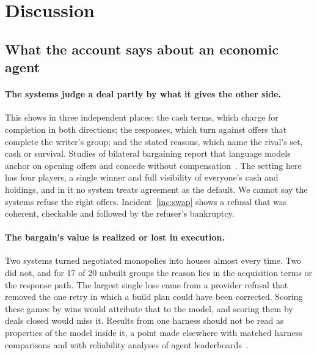 \section{Discussion}
\label{sec:discussion}

\subsection{What the account says about an economic agent}

\paragraph{The systems judge a deal partly by what it gives the other side.} This shows in three independent places: the cash terms, which charge for completion in both directions; the responses, which turn against offers that complete the writer's group; and the stated reasons, which name the rival's set, cash or survival. Studies of bilateral bargaining report that language models anchor on opening offers and concede without compensation~\cite{cosentino2026counterparty,shah2025rationalis}. The setting here has four players, a single winner and full visibility of everyone's cash and holdings, and in it no system treats agreement as the default. We cannot say the systems refuse the right offers. Incident~\ref{inc:swap} shows a refusal that was coherent, checkable and followed by the refuser's bankruptcy.

\paragraph{The bargain's value is realized or lost in execution.} Two systems turned negotiated monopolies into houses almost every time. Two did not, and for 17 of 20 unbuilt groups the reason lies in the acquisition terms or the response path. The largest single loss came from a provider refusal that removed the one retry in which a build plan could have been corrected. Scoring these games by wins would attribute that to the model, and scoring them by deals closed would miss it. Results from one harness should not be read as properties of the model inside it, a point made elsewhere with matched harness comparisons and with reliability analyses of agent leaderboards~\cite{zhang2026dece,hardy2026reliability}.

